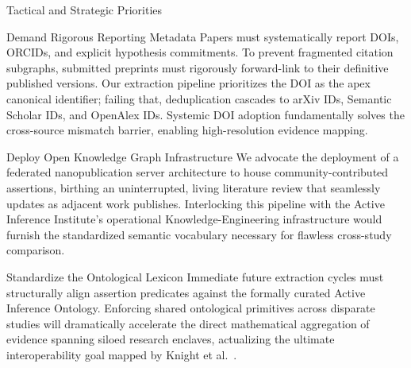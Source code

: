 \documentclass[
  ignorenonframetext,
]{beamer}
\begin{document}
\begin{frame}{Tactical and Strategic Priorities}
\protect{}\label{tactical-and-strategic-priorities}
\begin{block}{Demand Rigorous Reporting Metadata}
\protect{}\label{demand-rigorous-reporting-metadata}
Papers must systematically report DOIs, ORCIDs, and explicit hypothesis
commitments. To prevent fragmented citation subgraphs, submitted
preprints must rigorously forward-link to their definitive published
versions. Our extraction pipeline prioritizes the DOI as the apex
canonical identifier; failing that, deduplication cascades to arXiv IDs,
Semantic Scholar IDs, and OpenAlex IDs. Systemic DOI adoption
fundamentally solves the cross-source mismatch barrier, enabling
high-resolution evidence mapping.
\end{block}

\begin{block}{Deploy Open Knowledge Graph Infrastructure}
\protect{}\label{deploy-open-knowledge-graph-infrastructure}
We advocate the deployment of a federated nanopublication server
architecture to house community-contributed assertions, birthing an
uninterrupted, living literature review that seamlessly updates as
adjacent work publishes. Interlocking this pipeline with the Active
Inference Institute's operational Knowledge-Engineering infrastructure
\citep{knight2022fep} would furnish the standardized semantic vocabulary
necessary for flawless cross-study comparison.
\end{block}

\begin{block}{Standardize the Ontological Lexicon}
\protect{}\label{standardize-the-ontological-lexicon}
Immediate future extraction cycles must structurally align assertion
predicates against the formally curated Active Inference Ontology.
Enforcing shared ontological primitives across disparate studies will
dramatically accelerate the direct mathematical aggregation of evidence
spanning siloed research enclaves, actualizing the ultimate
interoperability goal mapped by Knight et al.~\citep{knight2022fep}.
\end{block}
\end{frame}
\end{document}
